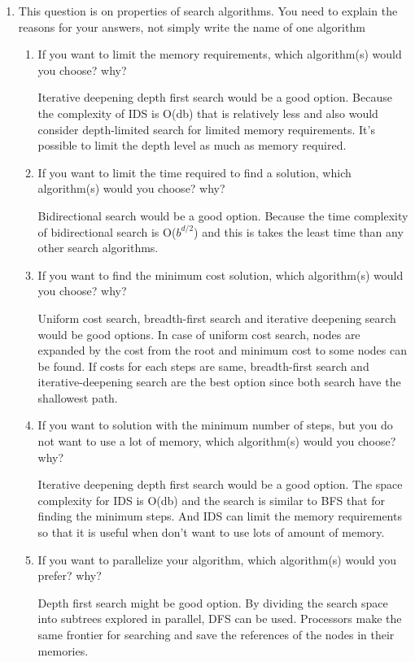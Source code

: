 \documentclass[12pt]{article}
\begin{document}
\begin{enumerate}
\begin{enumerate}
  \end{enumerate}

\item This question is on properties of search algorithms. You need to explain the reasons for your answers, not simply write the name of one algorithm
  \begin{enumerate}
  \item If you want to limit the memory requirements, which algorithm(s) would you choose? why?

  Iterative deepening depth first search would be a good option. Because the complexity of IDS is O(db) that is relatively less and also would consider depth-limited search for limited memory requirements. It's possible to limit the depth level as much as memory required.

  \item If you want to limit the time required to find a solution, which algorithm(s) would you choose? why?
  
  Bidirectional search would be a good option. Because the time complexity of bidirectional search is O($b^{d/2}$) and this is takes the least time than any other search algorithms.
  
  \item If you want to find the minimum cost solution, which algorithm(s) would you choose? why?
  
  Uniform cost search, breadth-first search and iterative deepening search would be good options. In case of uniform cost search, nodes are expanded by the cost from the root and minimum cost to some nodes can be found. If costs for each steps are same, breadth-first search and iterative-deepening search are the best option since both search have the shallowest path.
  
  \item If you want to solution with the minimum number of steps, but you do not want to use a lot of memory, which algorithm(s) would you choose? why?
  
  Iterative deepening depth first search would be a good option. The space complexity for IDS is O(db) and the search is similar to BFS that for finding the minimum steps. And IDS can limit the memory requirements so that it is useful when don't want to use lots of amount of memory.
  
  \item If you want to parallelize your algorithm, which algorithm(s) would you prefer? why?
  
  Depth first search might be good option. By dividing the search space into subtrees explored in parallel, DFS can be used. Processors make the same frontier for searching and save the references of the nodes in their memories.
  

\end{enumerate}
\end{enumerate}
\end{document}
